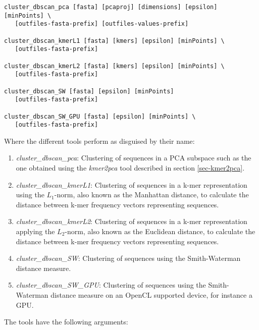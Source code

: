 \begin{lstlisting}
cluster_dbscan_pca [fasta] [pcaproj] [dimensions] [epsilon] [minPoints] \
   [outfiles-fasta-prefix] [outfiles-values-prefix]

cluster_dbscan_kmerL1 [fasta] [kmers] [epsilon] [minPoints] \
   [outfiles-fasta-prefix]

cluster_dbscan_kmerL2 [fasta] [kmers] [epsilon] [minPoints] \
   [outfiles-fasta-prefix]

cluster_dbscan_SW [fasta] [epsilon] [minPoints]
   [outfiles-fasta-prefix]

cluster_dbscan_SW_GPU [fasta] [epsilon] [minPoints] \
   [outfiles-fasta-prefix]   
\end{lstlisting}
Where the different tools perform as disguised by their name:
\begin{enumerate}
  \item \emph{cluster\_dbscan\_pca}: Clustering of sequences in a PCA
    subspace such as the one obtained using the \emph{kmer2pca} tool
    described in section \ref{sec-kmer2pca}.
  \item \emph{cluster\_dbscan\_kmerL1}: Clustering of sequences in a
    k-mer representation using the $L_1$-norm, also known as the
    Manhattan distance, to calculate the distance between k-mer
    frequency vectors representing sequences. 
  \item \emph{cluster\_dbscan\_kmerL2}: Clustering of sequences in a
    k-mer representation applying the $L_2$-norm, also known as the
    Euclidean distance, to calculate the distance between k-mer
    frequency vectors representing sequences.
  \item \emph{cluster\_dbscan\_SW}: Clustering of sequences using the
    Smith-Waterman distance measure.
  \item \emph{cluster\_dbscan\_SW\_GPU}: Clustering of sequences using
    the Smith-Waterman distance measure on an OpenCL supported device,
    for instance a GPU.
\end{enumerate}
The tools have the following arguments:
